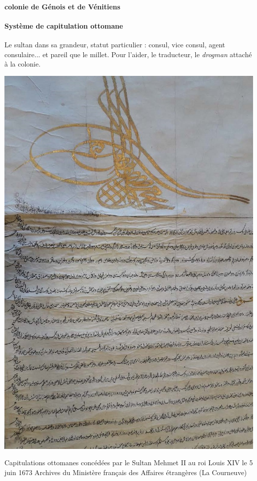 \paragraph{colonie de Génois et de Vénitiens} 

\paragraph{Système de capitulation ottomane} Le sultan dans sa grandeur, statut particulier : consul, vice consul, agent consulaire... et pareil que le millet. Pour l'aider, le traducteur, le \textit{drogman} attaché à la colonie. 
\begin{marginfigure}
    \centering
    \includegraphics[width=\textwidth]{HistoireIslamMediterranee/Images/firman.jpg}
    \caption{Capitulations ottomanes concédées par le Sultan
Mehmet II au roi Louis XIV le 5 juin 1673
Archives du Ministère français des Affaires
étrangères (La Courneuve)}
    \label{fig:my_label}
\end{marginfigure}
